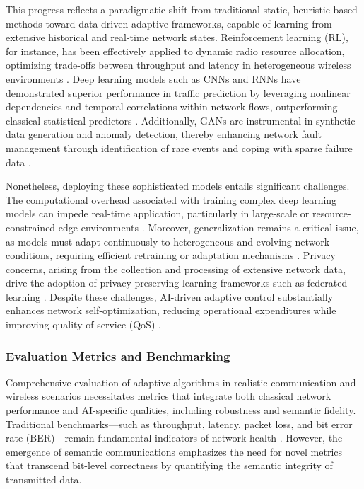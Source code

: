 \documentclass[sigconf]{acmart}
\begin{document}
This progress reflects a paradigmatic shift from traditional static, heuristic-based methods toward data-driven adaptive frameworks, capable of learning from extensive historical and real-time network states. Reinforcement learning (RL), for instance, has been effectively applied to dynamic radio resource allocation, optimizing trade-offs between throughput and latency in heterogeneous wireless environments \cite{ref1,ref7}. Deep learning models such as CNNs and RNNs have demonstrated superior performance in traffic prediction by leveraging nonlinear dependencies and temporal correlations within network flows, outperforming classical statistical predictors \cite{ref2,ref3,ref5}. Additionally, GANs are instrumental in synthetic data generation and anomaly detection, thereby enhancing network fault management through identification of rare events and coping with sparse failure data \cite{ref6,ref10}.

Nonetheless, deploying these sophisticated models entails significant challenges. The computational overhead associated with training complex deep learning models can impede real-time application, particularly in large-scale or resource-constrained edge environments \cite{ref4,ref5}. Moreover, generalization remains a critical issue, as models must adapt continuously to heterogeneous and evolving network conditions, requiring efficient retraining or adaptation mechanisms \cite{ref7}. Privacy concerns, arising from the collection and processing of extensive network data, drive the adoption of privacy-preserving learning frameworks such as federated learning \cite{ref10,ref11}. Despite these challenges, AI-driven adaptive control substantially enhances network self-optimization, reducing operational expenditures while improving quality of service (QoS) \cite{ref14,ref50}.

\subsubsection{Evaluation Metrics and Benchmarking}

Comprehensive evaluation of adaptive algorithms in realistic communication and wireless scenarios necessitates metrics that integrate both classical network performance and AI-specific qualities, including robustness and semantic fidelity. Traditional benchmarks---such as throughput, latency, packet loss, and bit error rate (BER)---remain fundamental indicators of network health \cite{ref3,ref5}. However, the emergence of semantic communications emphasizes the need for novel metrics that transcend bit-level correctness by quantifying the semantic integrity of transmitted data.
\end{document}
